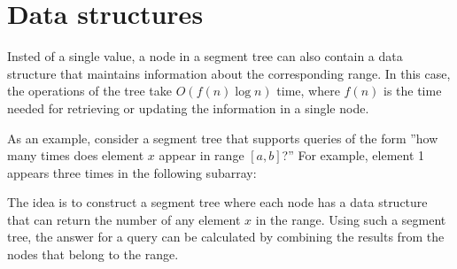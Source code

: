 \section{Data structures}

Insted of a single value, a node in a segment tree
can also contain a data structure that maintains information
about the corresponding range.
In this case, the operations of the tree take
$O(f(n) \log n)$ time, where $f(n)$ is
the time needed for retrieving or updating the
information in a single node.

As an example, consider a segment tree that
supports queries of the form
''how many times does element $x$ appear
in range $[a,b]$?''
For example, element 1 appears three times
in the following subarray:

\begin{center}
\end{center}

The idea is to construct a segment tree
where each node has a data structure
that can return the number of any element $x$
in the range.
Using such a segment tree,
the answer for a query can be calculated
by combining the results from the nodes
that belong to the range.

